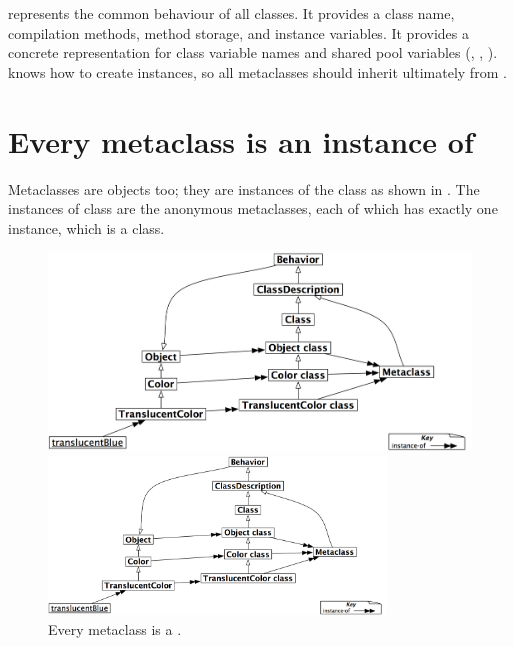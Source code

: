 \documentclass[a4paper,10pt,twoside]{book}
\begin{document}
 represents the common behaviour of all classes.
It provides a class name, compilation methods, method storage, and instance variables.
It provides a concrete representation for class variable names and shared pool variables (, , ).
 knows how to create instances, so all metaclasses should inherit ultimately from .

\section{Every metaclass is an instance of }

Metaclasses are objects too; they are instances of the class  as shown in . The instances of class  are the anonymous metaclasses, each of which 
has exactly one instance, which is a class.

\begin{center}
\begin{figure}
\ifluluelse
	{\centerline{\includegraphics[width=\textwidth]{TranslucentMetaclassClass}}}
	{\centerline{\includegraphics[width=0.8\textwidth]{TranslucentMetaclassClass}}}
\caption{Every metaclass is a .\label{fig:metaclassclass}}
\end{figure}
\end{center}
\end{document}
